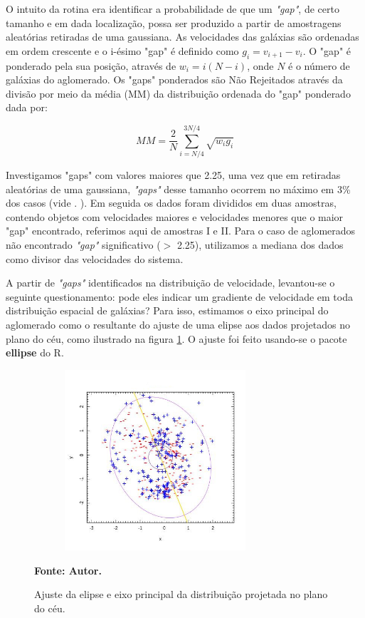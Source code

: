 O intuito da rotina era identificar a probabilidade de que um \textit{"gap"},  de certo tamanho e em dada localização, possa ser produzido a partir de amostragens aleatórias retiradas de uma gaussiana. As velocidades das galáxias são ordenadas em ordem crescente e o i-ésimo "gap" é definido como $g_i = v_{i+1} - v_i$. O "gap" é ponderado pela sua posição, através de $w_i=i(N-i)$, onde $N$ é o número de galáxias do aglomerado. Os "gaps" ponderados são Não Rejeitados através da divisão por meio da média (MM) da distribuição ordenada do "gap" ponderado dada por: 

\begin{equation}
MM = \frac{2}{N} \sum_{i=N/4}^{3N/4} \sqrt{w_i g_i}
\label{eq:gappomderado}
\end{equation}

Investigamos "gaps" com valores maiores que 2.25, uma vez que em retiradas aleatórias de uma gaussiana, \textit{"gaps"} desse tamanho ocorrem no máximo em 3\% dos casos (vide . ). Em seguida os dados foram divididos em duas amostras, contendo objetos com velocidades maiores e velocidades menores que o maior "gap" encontrado, referimos aqui de amostras I e II. Para o caso de aglomerados não encontrado \textit{"gap"} significativo ($>$ 2.25), utilizamos a mediana dos dados como divisor das velocidades do sistema.


A partir de \textit{"gaps"} identificados na distribuição de velocidade, levantou-se o seguinte questionamento: pode eles indicar um gradiente de velocidade em toda distribuição espacial de galáxias? Para isso, estimamos o eixo principal do aglomerado como o resultante do ajuste de uma elipse aos dados projetados no plano do céu, como ilustrado na figura \ref{elipse}. O ajuste foi feito usando-se o pacote \textbf{ellipse} do R.

\begin{figure}[H] %
\vspace{-2pt}
\begin{center}
\includegraphics[height=6.7cm,width=9cm]{04-figuras/elipse}%
\caption{Ajuste da elipse e eixo principal da distribuição projetada no plano do céu.}
\textbf{Fonte: Autor.}
\label{elipse}%
\end{center}
\end{figure}


